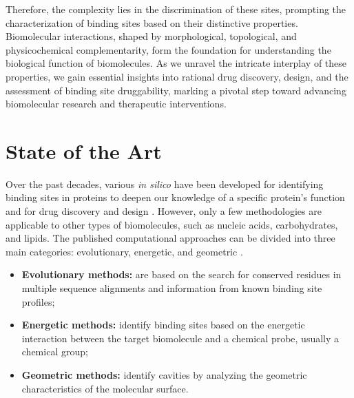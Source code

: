 \documentclass[Ingles]{phdthesis}
\begin{document}
Therefore, the complexity lies in the discrimination of these sites, prompting the characterization of binding sites based on their distinctive properties. Biomolecular interactions, shaped by morphological, topological, and physicochemical complementarity, form the foundation for understanding the biological function of biomolecules. As we unravel the intricate interplay of these properties, we gain essential insights into rational drug discovery, design, and the assessment of binding site druggability, marking a pivotal step toward advancing biomolecular research and therapeutic interventions.

\section{State of the Art \label{sec:state-of-the-art}}

Over the past decades, various \textit{in silico} have been developed for identifying binding sites in proteins to deepen our knowledge of a specific protein's function and for drug discovery and design \cite{liang1998}. However, only a few methodologies are applicable to other types of biomolecules, such as nucleic acids, carbohydrates, and lipids. The published computational approaches can be divided into three main categories: evolutionary, energetic, and geometric \cite{oliveira2014,simoes2017,guerra2019}.

\begin{itemize}
  \item \textbf{Evolutionary methods:} are based on the search for conserved residues in multiple sequence alignments and information from known binding site profiles;
  \item \textbf{Energetic methods:} identify binding sites based on the energetic interaction between the target biomolecule and a chemical probe, usually a chemical group;
  \item \textbf{Geometric methods:} identify cavities by analyzing the geometric characteristics of the molecular surface.
\end{itemize}
\end{document}
